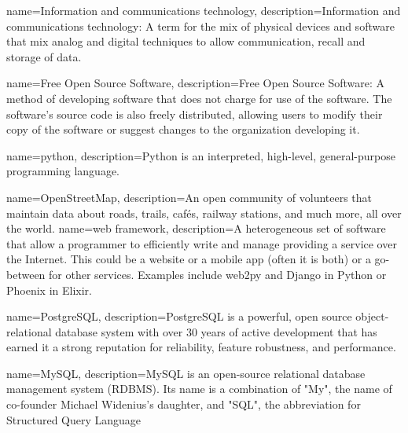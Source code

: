 

{
    name=Information and communications technology,
    description={Information and communications technology: A term for the mix of physical devices and software that mix analog and digital techniques to allow communication, recall and storage of data.}
}
 
{
    name=Free Open Source Software,
    description={Free Open Source Software: A method of developing software that does not charge for use of the software. The software's source code is also freely distributed, allowing users to modify their copy of the software or suggest changes to the organization developing it.}
}

{
    name=python,
    description={Python is an interpreted, high-level, general-purpose programming language.}
}

{
    name=OpenStreetMap,
    description={An open community of volunteers that maintain data about roads, trails, cafés, railway stations, and much more, all over the world.}
}
{
    name=web framework,
    description={A heterogeneous set of software that allow a programmer to efficiently write and manage providing a service over the Internet. This could be a website or a mobile app (often it is both) or a go-between for other services. Examples include web2py and Django in Python or Phoenix in Elixir.}
}

{
   name=PostgreSQL,
   description={PostgreSQL is a powerful, open source object-relational database system with over 30 years of active development that has earned it a strong reputation for reliability, feature robustness, and performance.}
}

{
   name=MySQL,
   description={MySQL is an open-source relational database management system (RDBMS). Its name is a combination of "My", the name of co-founder Michael Widenius's daughter, and "SQL", the abbreviation for Structured Query Language}
}

